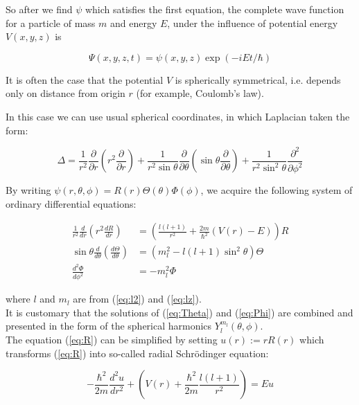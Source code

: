 \documentclass[11pt, a4paper, german]{article}
\numberwithin{equation}{section}
\numberwithin{theorem}{section}
\begin{document}
So after we find $\psi$ which satisfies the first equation, the complete wave function for a particle of mass $m$ and energy $E$, under the influence of potential energy $V(x,y,z)$ is 

\begin{equation}
\Psi(x,y,z,t) = \psi(x,y,z)\exp(-iEt/\hbar)
\end{equation}

It is often the case that the potential $V$ is spherically symmetrical, i.e. depends only on distance from origin $r$ (for example, Coulomb's law).

In this case we can use usual spherical coordinates, in which Laplacian taken the form:

$$ \Delta = \frac{1}{r^2} \frac{\partial}{\partial r}\left(r^2 \frac{\partial}{\partial r}\right) + \frac{1}{r^2 \sin \theta} \frac{\partial}{\partial \theta} \left( \sin \theta \frac{\partial}{\partial \theta}\right) + \frac{1}{r^2 \sin^2 \theta}\frac{\partial ^2}{\partial \phi ^2}$$

By writing $\psi(r, \theta, \phi) = R(r)\Theta(\theta)\Phi(\phi)$, we acquire the following system of ordinary differential equations:

\begin{align} 
\frac{1}{r^2}\frac{d}{dr}\left(r^2 \frac{dR}{dr}\right) &= \left(\frac{l(l+1)}{r^2} + \frac{2m}{\hbar^2}(V(r)-E)\right) R \label{eq:R}\\
\sin \theta \frac{d}{d\theta}\left( \frac{d\Theta}{d \theta}\right) &= \left( m_l^2 - l(l+1)\sin^2\theta\right)\Theta \label{eq:Theta} \\
\frac{d^2\Phi}{d\phi^2} &= -m_l^2\Phi \label{eq:Phi}
\end{align}

where $l$ and $m_l$ are from (\ref{eq:l2}) and (\ref{eq:lz}).\\

It is customary that the solutions of (\ref{eq:Theta}) and (\ref{eq:Phi}) are combined and presented in the form of the spherical harmonics $Y^{m_l}_l(\theta, \phi)$. \\

The equation (\ref{eq:R}) can be simplified by setting $u(r) := r R(r)$ which transforms (\ref{eq:R}) into so-called radial Schrödinger equation:

\begin{equation} \label{eq:radial-schroedinger-equation}
-\frac{\hbar^2}{2m}\frac{d^2u}{dr^2}+\left(V(r)+\frac{\hbar^2}{2m}\frac{l(l+1)}{r^2}\right) = Eu
\end{equation}
\end{document}
